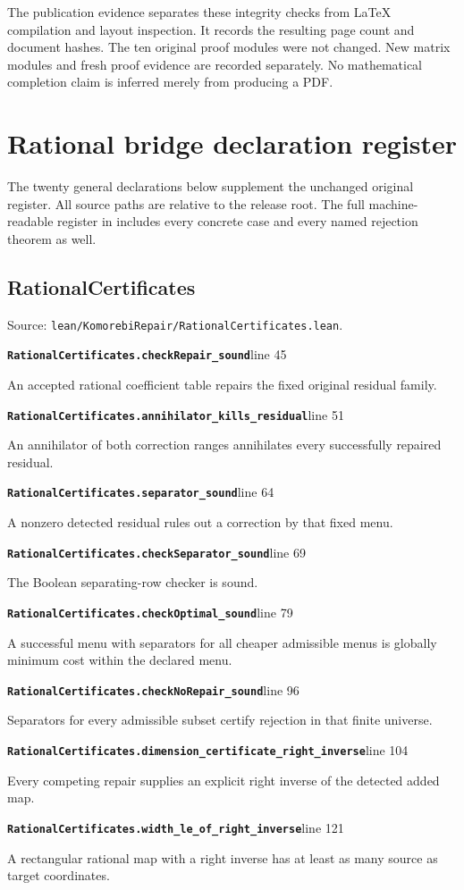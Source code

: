\documentclass[11pt,letterpaper,oneside,openany]{book}
\theoremstyle{quiet}
\newcommand{\code}[1]{\texttt{\detokenize{#1}}}
\newcommand{\record}[3]{\noindent\begin{minipage}{\linewidth}\small\textbf{\nolinkurl{#1}}\hfill\textsf{line #2}\par\smallskip #3\end{minipage}\par\vspace{7pt}}
\begin{document}
The publication evidence separates these integrity checks from LaTeX compilation and layout inspection. It records the resulting page count and document hashes. The ten original proof modules were not changed. New matrix modules and fresh proof evidence are recorded separately. No mathematical completion claim is inferred merely from producing a PDF.

\chapter{Rational bridge declaration register}\label{app:rational-register}

The twenty general declarations below supplement the unchanged original register. All source paths are relative to the release root. The full machine-readable register in \code{docs/theorem_registry.json} includes every concrete case and every named rejection theorem as well.

\section{RationalCertificates}

Source: \nolinkurl{lean/KomorebiRepair/RationalCertificates.lean}.

\record{RationalCertificates.checkRepair_sound}{45}{An accepted rational coefficient table repairs the fixed original residual family.}

\record{RationalCertificates.annihilator_kills_residual}{51}{An annihilator of both correction ranges annihilates every successfully repaired residual.}

\record{RationalCertificates.separator_sound}{64}{A nonzero detected residual rules out a correction by that fixed menu.}

\record{RationalCertificates.checkSeparator_sound}{69}{The Boolean separating-row checker is sound.}

\record{RationalCertificates.checkOptimal_sound}{79}{A successful menu with separators for all cheaper admissible menus is globally minimum cost within the declared menu.}

\record{RationalCertificates.checkNoRepair_sound}{96}{Separators for every admissible subset certify rejection in that finite universe.}

\record{RationalCertificates.dimension_certificate_right_inverse}{104}{Every competing repair supplies an explicit right inverse of the detected added map.}

\record{RationalCertificates.width_le_of_right_inverse}{121}{A rectangular rational map with a right inverse has at least as many source as target coordinates.}
\end{document}
